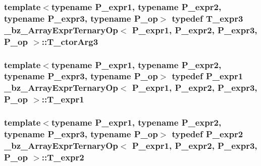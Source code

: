 \subsubsection[{T\+\_\+ctor\+Arg3}]{\setlength{\rightskip}{0pt plus 5cm}template$<$typename P\+\_\+expr1, typename P\+\_\+expr2, typename P\+\_\+expr3, typename P\+\_\+op$>$ typedef {\bf T\+\_\+expr3} {\bf \+\_\+bz\+\_\+\+Array\+Expr\+Ternary\+Op}$<$ P\+\_\+expr1, P\+\_\+expr2, P\+\_\+expr3, P\+\_\+op $>$\+::{\bf T\+\_\+ctor\+Arg3}}\label{class__bz__ArrayExprTernaryOp_a16f21234186e83d551d36d5b248aeeeb}
\hypertarget{class__bz__ArrayExprTernaryOp_af7fa0e8d4f015bc9ab42313078639196}{}
\subsubsection[{T\+\_\+expr1}]{\setlength{\rightskip}{0pt plus 5cm}template$<$typename P\+\_\+expr1, typename P\+\_\+expr2, typename P\+\_\+expr3, typename P\+\_\+op$>$ typedef P\+\_\+expr1 {\bf \+\_\+bz\+\_\+\+Array\+Expr\+Ternary\+Op}$<$ P\+\_\+expr1, P\+\_\+expr2, P\+\_\+expr3, P\+\_\+op $>$\+::{\bf T\+\_\+expr1}}\label{class__bz__ArrayExprTernaryOp_af7fa0e8d4f015bc9ab42313078639196}
\hypertarget{class__bz__ArrayExprTernaryOp_a392ed3a88602f5352a558ce6277cde22}{}
\subsubsection[{T\+\_\+expr2}]{\setlength{\rightskip}{0pt plus 5cm}template$<$typename P\+\_\+expr1, typename P\+\_\+expr2, typename P\+\_\+expr3, typename P\+\_\+op$>$ typedef P\+\_\+expr2 {\bf \+\_\+bz\+\_\+\+Array\+Expr\+Ternary\+Op}$<$ P\+\_\+expr1, P\+\_\+expr2, P\+\_\+expr3, P\+\_\+op $>$\+::{\bf T\+\_\+expr2}}\label{class__bz__ArrayExprTernaryOp_a392ed3a88602f5352a558ce6277cde22}
\hypertarget{class__bz__ArrayExprTernaryOp_a809b1acdc0c2ffe359711f40d2688526}{}

